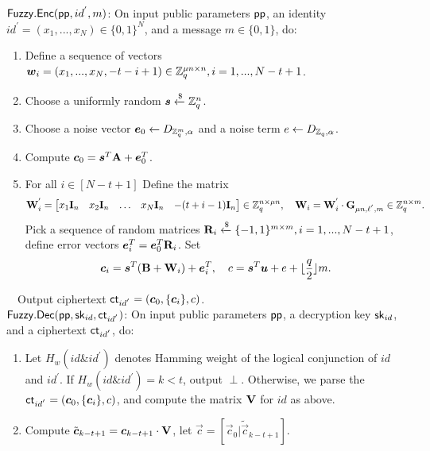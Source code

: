 \documentclass{llncs}
\begin{document}
\begin{appendix}
$\mathsf{Fuzzy}.\mathsf{Enc}(\mathsf{pp}, id^{'}, m)$: On input public parameters $\mathsf{pp}$, an identity $id^{'}=(x_{1},...,x_{N}) \in \{0,1\}^{N}$, and a message $m \in \{0,1\}$, do:
\begin{enumerate}
\item Define a sequence of vectors $\boldsymbol{w}_{i}=(x_{1},...,x_{N},-t-i+1) \in \mathbb{Z}^{\mu n \times n}_{q}, i=1,...,N-t+1$.
\item Choose a uniformly random $\boldsymbol{s}\xleftarrow{\$} \mathbb{Z}^{n}_{q}$.\\
\item Choose a noise vector $\boldsymbol{e}_{0}\leftarrow D_{\mathbb{Z}^{m}_{q},\alpha}$ and a noise term $e\leftarrow D_{\mathbb{Z}_{q},\alpha}$.\\
\item Compute $\boldsymbol{c}_{0}=\boldsymbol{s}^{T}\mathbf{A}+\boldsymbol{e}^{T}_{0}$.\\
\item For all $i \in [N-t+1]$ Define the matrix
\begin{equation}
\mathbf{W}^{'}_{i}= \begin{bmatrix}
x_{1} \mathbf{I}_{n}&x_{2} \mathbf{I}_{n}&\ldots&x_{N} \mathbf{I}_{n}& -(t+i-1)\mathbf{I}_{n}
\end{bmatrix} \in \mathbb{Z}^{n \times \mu n}_{q},~~~ \mathbf{W}_{i}=\mathbf{W}^{'}_{i}\cdot \mathbf{G}_{\mu n,\ell^{'},m} \in \mathbb{Z}^{n \times m}_{q}.
\end{equation}
Pick a sequence of random matrices $\mathbf{R}_{i}\xleftarrow{\$} \{-1,1\}^{m \times m}, i=1,...,N-t+1$, define error vectors $\boldsymbol{e}^{T}_{i}=\boldsymbol{e}^{T}_{0}\mathbf{R}_{i}$. Set
\begin{equation}
\boldsymbol{c}_{i}=\boldsymbol{s}^{T}(\mathbf{B}+\mathbf{W}_{i})+\boldsymbol{e}^{T}_{i},~~~c=\boldsymbol{s}^{T}\boldsymbol{u}+e+\lfloor \frac{q}{2} \rfloor m.
\end{equation}
\end{enumerate}
~~Output ciphertext  $\mathsf{ct}_{id^{'}}=(\boldsymbol{c}_{0},\{\boldsymbol{c}_{i}\},c)$.\\[0.4cm]
$\mathsf{Fuzzy}.\mathsf{Dec}(\mathsf{pp}, \mathsf{sk}_{id}, \mathsf{ct}_{id^{'}})$: On input public parameters $\mathsf{pp}$, a decryption key $\mathsf{sk}_{id}$, and a ciphertext $\mathsf{ct}_{id^{'}}$, do:
\begin{enumerate}
\item Let $H_{w}(id \& id^{'})$ denotes Hamming weight of the logical conjunction of $id$ and $id^{'}$. If $H_{w}(id \& id^{'})=k<t$, output $\perp$. Otherwise, we parse the $\mathsf{ct}_{id^{'}}=(\boldsymbol{c}_{0},\{\boldsymbol{c}_{i}\},c)$, and compute the matrix $\mathbf{V}$ for $id$ as above.\\
\item Compute $\tilde{\boldsymbol{c}}_{k-t+1}=\boldsymbol{c}_{k-t+1}\cdot \mathbf{V}$, let $\vec{c}=[\vec{c}_{0}|\tilde{\vec{c}}_{k-t+1}]$.\\

\end{enumerate}
\end{appendix}
\end{document}
